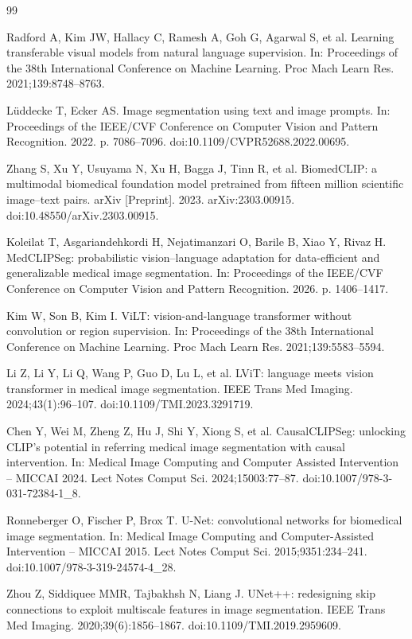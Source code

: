 \begin{thebibliography}{99}

Radford A, Kim JW, Hallacy C, Ramesh A, Goh G, Agarwal S, et al. Learning transferable visual models from natural language supervision. In: Proceedings of the 38th International Conference on Machine Learning. Proc Mach Learn Res. 2021;139:8748--8763.

L\"uddecke T, Ecker AS. Image segmentation using text and image prompts. In: Proceedings of the IEEE/CVF Conference on Computer Vision and Pattern Recognition. 2022. p. 7086--7096. doi:10.1109/CVPR52688.2022.00695.

Zhang S, Xu Y, Usuyama N, Xu H, Bagga J, Tinn R, et al. BiomedCLIP: a multimodal biomedical foundation model pretrained from fifteen million scientific image--text pairs. arXiv [Preprint]. 2023. arXiv:2303.00915. doi:10.48550/arXiv.2303.00915.

Koleilat T, Asgariandehkordi H, Nejatimanzari O, Barile B, Xiao Y, Rivaz H. MedCLIPSeg: probabilistic vision--language adaptation for data-efficient and generalizable medical image segmentation. In: Proceedings of the IEEE/CVF Conference on Computer Vision and Pattern Recognition. 2026. p. 1406--1417.

Kim W, Son B, Kim I. ViLT: vision-and-language transformer without convolution or region supervision. In: Proceedings of the 38th International Conference on Machine Learning. Proc Mach Learn Res. 2021;139:5583--5594.

Li Z, Li Y, Li Q, Wang P, Guo D, Lu L, et al. LViT: language meets vision transformer in medical image segmentation. IEEE Trans Med Imaging. 2024;43(1):96--107. doi:10.1109/TMI.2023.3291719.

Chen Y, Wei M, Zheng Z, Hu J, Shi Y, Xiong S, et al. CausalCLIPSeg: unlocking CLIP's potential in referring medical image segmentation with causal intervention. In: Medical Image Computing and Computer Assisted Intervention -- MICCAI 2024. Lect Notes Comput Sci. 2024;15003:77--87. doi:10.1007/978-3-031-72384-1\_8.

Ronneberger O, Fischer P, Brox T. U-Net: convolutional networks for biomedical image segmentation. In: Medical Image Computing and Computer-Assisted Intervention -- MICCAI 2015. Lect Notes Comput Sci. 2015;9351:234--241. doi:10.1007/978-3-319-24574-4\_28.

Zhou Z, Siddiquee MMR, Tajbakhsh N, Liang J. UNet++: redesigning skip connections to exploit multiscale features in image segmentation. IEEE Trans Med Imaging. 2020;39(6):1856--1867. doi:10.1109/TMI.2019.2959609.


\end{thebibliography}
